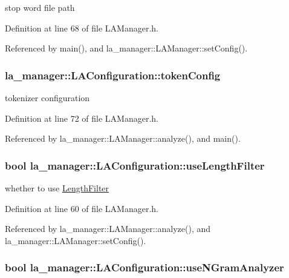 stop word file path 



Definition at line 68 of file LAManager.h.

Referenced by main(), and la\_\-manager::LAManager::setConfig().\hypertarget{classla__manager_1_1LAConfiguration_3f916f330bfc6dc84ea5db64e4e2a75c}{
\subsubsection[{tokenConfig}]{ {\bf la\_\-manager::LAConfiguration::tokenConfig}}}
\label{classla__manager_1_1LAConfiguration_3f916f330bfc6dc84ea5db64e4e2a75c}


tokenizer configuration 



Definition at line 72 of file LAManager.h.

Referenced by la\_\-manager::LAManager::analyze(), and main().\hypertarget{classla__manager_1_1LAConfiguration_02c953de4f3db786e882ae7299b1afd0}{
\subsubsection[{useLengthFilter}]{\setlength{\rightskip}{0pt plus 5cm}bool {\bf la\_\-manager::LAConfiguration::useLengthFilter}}}
\label{classla__manager_1_1LAConfiguration_02c953de4f3db786e882ae7299b1afd0}


whether to use \hyperlink{classla__manager_1_1LengthFilter}{LengthFilter} 



Definition at line 60 of file LAManager.h.

Referenced by la\_\-manager::LAManager::analyze(), and la\_\-manager::LAManager::setConfig().\hypertarget{classla__manager_1_1LAConfiguration_9f03faf2af4dfd1deaea622324a7b8b2}{
\subsubsection[{useNGramAnalyzer}]{\setlength{\rightskip}{0pt plus 5cm}bool {\bf la\_\-manager::LAConfiguration::useNGramAnalyzer}}}
\label{classla__manager_1_1LAConfiguration_9f03faf2af4dfd1deaea622324a7b8b2}


